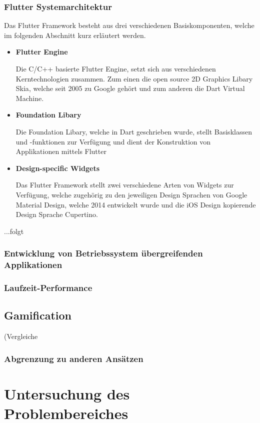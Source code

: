 \documentclass{scrreprt}
\begin{document}
\subsection{Flutter Systemarchitektur} 
Das Flutter Framework besteht aus drei verschiedenen Basiskomponenten, welche im folgenden Abschnitt kurz erläutert werden.
\begin{itemize}
\item{\textbf{Flutter Engine}}

Die C/C++ basierte Flutter Engine, setzt sich aus verschiedenen Kerntechnologien zusammen. Zum einen die open source 2D Graphics Libary Skia\cite{Skia1}, welche seit 2005 zu Google gehört und zum anderen die Dart Virtual Machine.
\item{\textbf{Foundation Libary}}

Die Foundation Libary, welche in Dart geschrieben wurde, stellt Basisklassen und -funktionen zur Verfügung und dient der Konstruktion von Applikationen mittels Flutter
\item{\textbf{Design-specific Widgets}}

Das Flutter Framework stellt zwei verschiedene Arten von Widgets zur Verfügung, welche zugehörig zu den jeweiligen Design Sprachen von Google Material Design\cite{Mat1}, welche 2014 entwickelt wurde und die iOS Design kopierende Design Sprache Cupertino\cite{Cup1}.
\end{itemize}

		...folgt

\subsection{Entwicklung von Betriebssystem übergreifenden Applikationen}

\subsection{Laufzeit-Performance}

\section{Gamification}
(Vergleiche \cite{Strahringer2017}
\subsection{Abgrenzung zu anderen Ansätzen}


\chapter{Untersuchung des Problembereiches}
\end{document}
